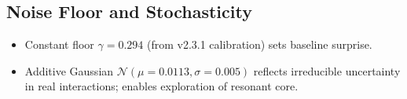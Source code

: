 \documentclass[11pt,a4paper]{article}
\begin{document}
	\subsection{Noise Floor and Stochasticity}
	\begin{itemize}[leftmargin=*,labelsep=1em]
		\item Constant floor $\gamma = 0.294$ (from v2.3.1 calibration) sets baseline surprise.
		\item Additive Gaussian $\mathcal{N}(\mu=0.0113, \sigma=0.005)$ reflects irreducible uncertainty in real interactions; enables exploration of resonant core.
	\end{itemize}
	\newpage
	
\end{document}

